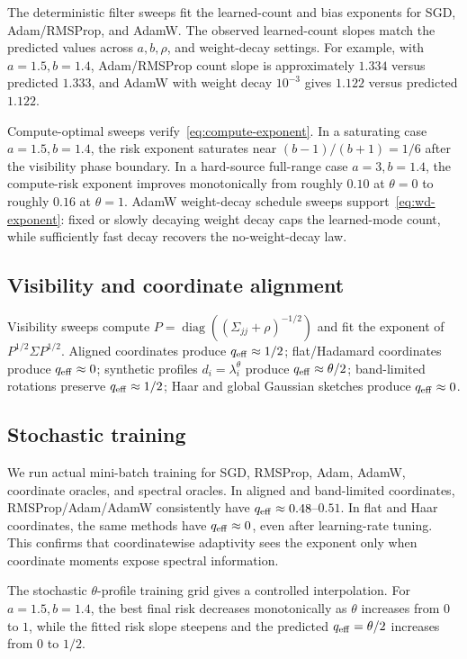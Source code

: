 \documentclass[11pt]{article}
\newcommand{\diag}{\operatorname{diag}}
\begin{document}
The deterministic filter sweeps fit the learned-count and bias exponents for SGD, Adam/RMSProp, and AdamW.  The observed learned-count slopes match the predicted values across $a,b,\rho$, and weight-decay settings.  For example, with $a=1.5,b=1.4$, Adam/RMSProp count slope is approximately $1.334$ versus predicted $1.333$, and AdamW with weight decay $10^{-3}$ gives $1.122$ versus predicted $1.122$.

Compute-optimal sweeps verify~\eqref{eq:compute-exponent}.  In a saturating case $a=1.5,b=1.4$, the risk exponent saturates near $(b-1)/(b+1)=1/6$ after the visibility phase boundary.  In a hard-source full-range case $a=3,b=1.4$, the compute-risk exponent improves monotonically from roughly $0.10$ at $\theta=0$ to roughly $0.16$ at $\theta=1$.  AdamW weight-decay schedule sweeps support~\eqref{eq:wd-exponent}: fixed or slowly decaying weight decay caps the learned-mode count, while sufficiently fast decay recovers the no-weight-decay law.

\subsection{Visibility and coordinate alignment}

Visibility sweeps compute $P=\diag((\Sigma_{jj}+\rho)^{-1/2})$ and fit the exponent of $P^{1/2}\Sigma P^{1/2}$.  Aligned coordinates produce $q_{\rm eff}\approx1/2$; flat/Hadamard coordinates produce $q_{\rm eff}\approx0$; synthetic profiles $d_i=\lambda_i^\theta$ produce $q_{\rm eff}\approx\theta/2$; band-limited rotations preserve $q_{\rm eff}\approx1/2$; Haar and global Gaussian sketches produce $q_{\rm eff}\approx0$.

\subsection{Stochastic training}

We run actual mini-batch training for SGD, RMSProp, Adam, AdamW, coordinate oracles, and spectral oracles.  In aligned and band-limited coordinates, RMSProp/Adam/AdamW consistently have $q_{\rm eff}\approx0.48$--$0.51$.  In flat and Haar coordinates, the same methods have $q_{\rm eff}\approx0$, even after learning-rate tuning.  This confirms that coordinatewise adaptivity sees the exponent only when coordinate moments expose spectral information.

The stochastic $\theta$-profile training grid gives a controlled interpolation.  For $a=1.5,b=1.4$, the best final risk decreases monotonically as $\theta$ increases from $0$ to $1$, while the fitted risk slope steepens and the predicted $q_{\rm eff}=\theta/2$ increases from $0$ to $1/2$.
\end{document}
